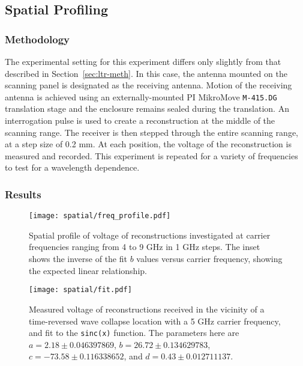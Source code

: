 \subsection{Spatial Profiling}
\label{sec:spatial-profile}
\subsubsection{Methodology}
The experimental setting for this experiment differs only slightly from that described in Section~\ref{sec:ltr-meth}. In this case, the antenna mounted on the scanning panel is designated as the receiving antenna. Motion of the receiving antenna is achieved using an externally-mounted PI MikroMove \texttt{M-415.DG} translation stage and the enclosure remains sealed during the translation. An interrogation pulse is used to create a reconstruction at the middle of the scanning range. The receiver is then stepped through the entire scanning range, at a step size of 0.2 mm. At each position, the \ptp{} voltage of the reconstruction is measured and recorded. This experiment is repeated for a variety of frequencies to test for a wavelength dependence.

\subsubsection{Results}
\label{sec:spatial-results}

\begin{figure}
\texttt{[image: spatial/freq\_profile.pdf]}
\caption[Spatial profile of reconstruction at various frequencies]{Spatial profile of \ptp{} voltage of reconstructions investigated at carrier frequencies ranging from 4 to 9 GHz in 1 GHz
steps.  The inset shows the inverse of the fit $b$ values versus carrier frequency, showing the expected linear relationship.}
\label{fig:spatial-freq-profile}

\vspace*{\floatsep}%

\texttt{[image: spatial/fit.pdf]}
\caption[Fit of spatial profile]{Measured \ptp{} voltage of reconstructions received in the
vicinity of a time-reversed wave collapse location with a 5 GHz carrier
frequency, and fit to the \texttt{sinc(x)} function. The parameters here are $a = 2.18 \pm 0.046397869$, $b = 26.72 \pm 0.134629783$, $c = -73.58 \pm 0.116338652$, and $d = 0.43 \pm 0.012711137$.}
\label{fig:spatial-error-fit}
\end{figure}

